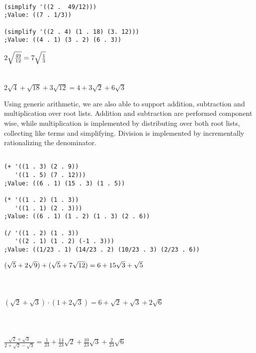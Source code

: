 \documentclass{article}
\begin{document}
\begin{minipage}[t]{0.5\textwidth}
\begin{verbatim}

(simplify '((2 .  49/12)))
;Value: ((7 . 1/3))

(simplify '((2 . 4) (1 . 18) (3. 12)))
;Value: ((4 . 1) (3 . 2) (6 . 3))

\end{verbatim}
\end{minipage}
\begin{minipage}[t]{0.5\textwidth}
$\\ 2\sqrt{\frac{49}{12}} = 7\sqrt{\frac{1}{3}}$\\ \\ \\
$2\sqrt{4} + \sqrt{18} + 3\sqrt{12} = 4 + 3\sqrt{2} + 6\sqrt{3}$
\end{minipage}	
				Using generic arithmetic, we are also able to support addition, subtraction and multiplication over root lists. Addition and subtraction are performed component wise, while multiplication is implemented by distributing over both root lists, collecting like terms and simplifying. Division is implemented by incrementally rationalizing the denominator.
				
 \begin{minipage}[t]{0.5\textwidth}
\begin{verbatim}

(+ '((1 . 3) (2 . 9))
   '((1 . 5) (7 . 12)))
;Value: ((6 . 1) (15 . 3) (1 . 5))

(* '((1 . 2) (1 . 3))
   '((1 . 1) (2 . 3)))
;Value: ((6 . 1) (1 . 2) (1 . 3) (2 . 6))

(/ '((1 . 2) (1 . 3))
   '((2 . 1) (1 . 2) (-1 . 3)))
;Value: ((1/23 . 1) (14/23 . 2) (10/23 . 3) (2/23 . 6))

\end{verbatim}
\end{minipage}
\begin{minipage}[t]{0.5\textwidth}
$\\(\sqrt{5}+2\sqrt{9})+(\sqrt{5} + 7\sqrt{12}) = 6 + 15 \sqrt{3} + \sqrt{5}$\\ \\ \\ \\
$(\sqrt{2} + \sqrt{3}) \cdot (1 + 2\sqrt{3}) = 6 + \sqrt{2} + \sqrt{3} + 2\sqrt{6}$ \\ \\ \\ \\
$\frac{\sqrt{2} + \sqrt{3}}{2 + \sqrt{2} - \sqrt{3}} = \frac{1}{23} + \frac{14}{23}\sqrt{2} + \frac{10}{23} \sqrt{3} + \frac{2}{23} \sqrt{6}$\\
\end{minipage}
\end{document}

